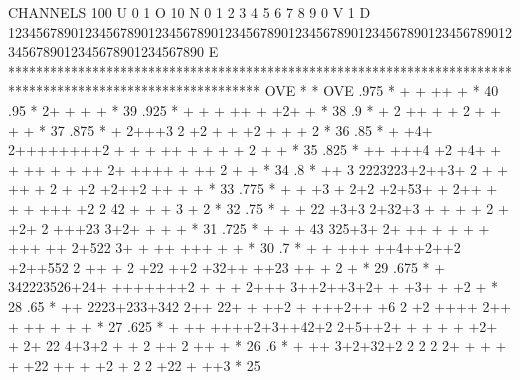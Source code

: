 \begin{Listing}
 CHANNELS 100 U 0                                                                                                  1 O 
           10 N 0        1         2         3         4         5         6         7         8         9         0 V 
            1 D 1234567890123456789012345678901234567890123456789012345678901234567890123456789012345678901234567890 E 
            ************************************************************************************************************
   OVE      *                                                                                                          * OVE
      .975  *                           +        +                          ++    +                                    *  40
      .95   *                           2+      +   +                                 +                                *  39
      .925  *                               +   + +  ++            +        +2+      +                                 *  38
      .9    *                         +      2 ++     +  +                      2 + +     +                   +        *  37
      .875  *                       +    2+++3 2 +2     +             +           +2   + +   +       2                 *  36
      .85   *                      +    +4+ 2++++++++2  + +    +  ++    +  + +  +          2        +             +    *  35
      .825  *               ++         +++4 +2 +4+ +     +  ++   +    +     ++    2+ ++++ +  ++   2            +  +    *  34
      .8    *                    ++   3  2223223+2++3+   2  + +    ++    + 2   +  +2 +2++2    ++  +   +                *  33
      .775  *                 +   + +3 + 2+2 +2+53+ + 2++  + +   +     +++ +2  2     42 + + +      3 +    2            *  32
      .75   *               +     +  22   +3+3 2+32+3 +      +  + + 2 + +2+  2 +++23  3+2+   +       + +               *  31
      .725  *                  +    +  + 43 325+3+ 2+   ++ +  + + +      +++   ++  2+522 3+  + ++  +++  +    +         *  30
      .7    *             + +  +++ ++4++2++2  +2++552  2 ++ +        2  +22    ++2 +32++  ++23  ++  +    2     +       *  29
      .675  *                    +  342223526+24+ +++++++2  +            + + 2+++ 3++2++3+2+  + +3+ +  +2        +     *  28
      .65   *                ++     2223+233+342 2++ 22+     +  ++2 + +++2++   +6 2 +2   ++++ 2++ + ++    + + +        *  27
      .625  *                + ++  ++++2+3++42+2 2+5++2+  + + +     +   +2+ + 2+  22 4+3+2 + + 2 ++ 2 ++ +             *  26
      .6    *                   +  ++ 3+2+32+2 2 2 2 2+ +  +  +     +   +22 ++  + +2  + 2 2 +22 +  ++3                 *  25

\end{Listing}
